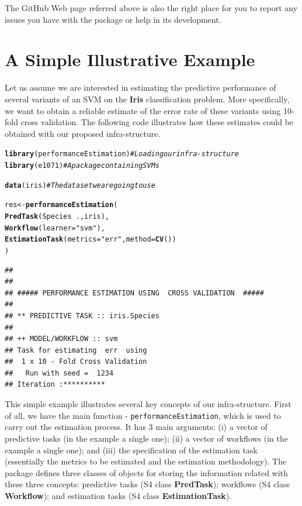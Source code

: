 \documentclass[10pt,a4paper]{article}\usepackage[]{graphicx}\usepackage[]{color}
\makeatletter
\newcommand{\hlstr}[1]{\textcolor[rgb]{0.192,0.494,0.8}{#1}}%
\newcommand{\hlcom}[1]{\textcolor[rgb]{0.678,0.584,0.686}{\textit{#1}}}%
\newcommand{\hlopt}[1]{\textcolor[rgb]{0,0,0}{#1}}%
\newcommand{\hlstd}[1]{\textcolor[rgb]{0.345,0.345,0.345}{#1}}%
\newcommand{\hlkwb}[1]{\textcolor[rgb]{0.69,0.353,0.396}{#1}}%
\newcommand{\hlkwc}[1]{\textcolor[rgb]{0.333,0.667,0.333}{#1}}%
\newcommand{\hlkwd}[1]{\textcolor[rgb]{0.737,0.353,0.396}{\textbf{#1}}}%
\newenvironment{kframe}{%
 \def\at@end@of@kframe{}%
 \ifinner\ifhmode%
  \def\at@end@of@kframe{\end{minipage}}%
  \begin{minipage}{\columnwidth}%
 \fi\fi%
 \def\FrameCommand##1{\hskip\@totalleftmargin \hskip-\fboxsep
 \colorbox{shadecolor}{##1}\hskip-\fboxsep
     \hskip-\linewidth \hskip-\@totalleftmargin \hskip\columnwidth}%
 \MakeFramed {\advance\hsize-\width
   \@totalleftmargin\z@ \linewidth\hsize
   \@setminipage}}%
 {\par\unskip\endMakeFramed%
 \at@end@of@kframe}
\newenvironment{knitrout}{}{} %
\makeatother
\begin{document}
The GitHub Web page referred above is also the right place for you to report any issues you have with the package or help in its development.


\section{A Simple Illustrative Example}\label{sec:simpleEx}

Let us assume we are interested in estimating the predictive performance of several variants of
an SVM on the
\textbf{Iris} classification problem. More specifically, we want to
obtain a reliable estimate of the error rate of these variants using
10-fold cross validation. The following code illustrates how these
estimates could be obtained with our proposed infra-structure.

\begin{knitrout}\footnotesize
{}\color{fgcolor}\begin{kframe}
\begin{alltt}
\hlkwd{library}\hlstd{(performanceEstimation)}  \hlcom{# Loading our infra-structure}
\hlkwd{library}\hlstd{(e1071)}                  \hlcom{# A package containing SVMs}

\hlkwd{data}\hlstd{(iris)}                      \hlcom{# The data set we are going to use}

\hlstd{res} \hlkwb{<-} \hlkwd{performanceEstimation}\hlstd{(}
         \hlkwd{PredTask}\hlstd{(Species} \hlopt{~} \hlstd{., iris),}
         \hlkwd{Workflow}\hlstd{(}\hlkwc{learner}\hlstd{=}\hlstr{"svm"}\hlstd{),}
         \hlkwd{EstimationTask}\hlstd{(}\hlkwc{metrics}\hlstd{=}\hlstr{"err"}\hlstd{,} \hlkwc{method}\hlstd{=}\hlkwd{CV}\hlstd{())}
         \hlstd{)}
\end{alltt}
\begin{verbatim}
## 
## 
## ##### PERFORMANCE ESTIMATION USING  CROSS VALIDATION  #####
## 
## ** PREDICTIVE TASK :: iris.Species
## 
## ++ MODEL/WORKFLOW :: svm 
## Task for estimating  err  using
##  1 x 10 - Fold Cross Validation
## 	 Run with seed =  1234 
## Iteration :**********
\end{verbatim}
\end{kframe}
\end{knitrout}

This simple example illustrates several key concepts of our
infra-structure. First of all, we have the main function  -
\texttt{performanceEstimation}, which is used to carry out
the estimation process. It has 3 main arguments: (i) a vector of
predictive tasks (in the example a single one); (ii) a vector of workflows (in the example a single one); and (iii) the
specification of the estimation task (essentially the metrics to be estimated and the estimation methodology). The package defines three classes of objects for storing the information related with these three concepts: predictive tasks (S4 class \textbf{PredTask}); workflows (S4 class \textbf{Workflow}); and estimation tasks (S4 class \textbf{EstimationTask}).
\end{document}
